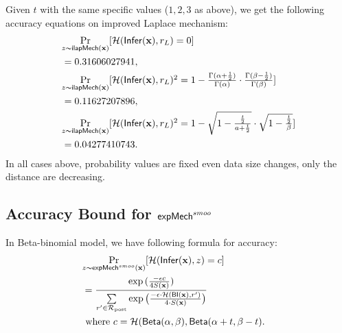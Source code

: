\documentclass{article}
\begin{document}
Given $t$ with the same specific values ($1, 2, 3$ as above), we get the following accuracy equations on improved Laplace mechanism:
%
%
%
\begin{align*}
&\underset{z \thicksim \mathsf{ilapMech}(\textbf{x})}{\Pr}[\textstyle\mathcal{H}(\mathsf{Infer}(\textbf{x}), r_L ) = 0]\\
&= 0.31606027941,\\
&\underset{z \thicksim \mathsf{ilapMech}(\textbf{x})}{\Pr}[\textstyle\mathcal{H}(\mathsf{Infer}(\textbf{x}), r_L )^2 = 1 - \frac{\Gamma(\alpha+\frac{1}{2})}{\Gamma(\alpha)} \cdot
\frac{\Gamma(\beta - \frac{1}{2})}{\Gamma(\beta)} ]\\
&= 0.11627207896,\\
&\underset{z \thicksim \mathsf{ilapMech}(\textbf{x})}{\Pr}[\textstyle\mathcal{H}(\mathsf{Infer}(\textbf{x}), r_L )^2 = 1 - 
  \sqrt{1 - \frac{\frac{t}{2}}{a + \frac{t}{2}}}
  \cdot
  \sqrt{1 - \frac{\frac{t}{2}}{\beta}}]\\
&= 0.04277410743.
\end{align*}
In all cases above, probability values are fixed even data size changes, only the distance are decreasing.

\subsection{Accuracy Bound for $\mathsf{expMech}^{smoo}$}
\label{subsec_accuracy_smoo}
  In Beta-binomial model,
  we have following formula for accuracy:
%
  \begin{align*}
  \lefteqn{ \hexpmechPr{\dataobs}{\hellinger(\bysinfer(\dataobs), z) = c  } }\\ 
  &  = \frac{\exp{(\frac{- \epsilon c}{4 S(\dataobs)})}}{\nomalizer{\dataobs}}\\
  & \text{ where } c = \hellinger(\betad(\alpha, \beta), \betad(\alpha + t, \beta - t).
  \end{align*}
\end{document}

